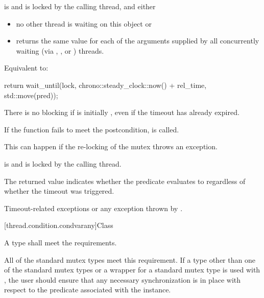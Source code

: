 \begin{itemdescr}
\pnum
\expects
{} is  and 
is locked by the calling thread, and either
\begin{itemize}
\item
no other thread is waiting on this  object or

\item
{} returns the same value for each of the  arguments
supplied by all concurrently waiting (via , , or
) threads.
\end{itemize}

\pnum
\effects
Equivalent to:
\begin{codeblock}
return wait_until(lock, chrono::steady_clock::now() + rel_time, std::move(pred));
\end{codeblock}

\pnum
\begin{note}
There is no blocking if  is initially , even if the
timeout has already expired.
\end{note}

\pnum
\remarks
If the function fails to meet the postcondition, 
is called.
\begin{note}
This can happen if the re-locking of the mutex throws an exception.
\end{note}

\pnum
\ensures
{} is  and 
is locked by the calling thread.

\pnum
\begin{note}
The returned value indicates whether the predicate evaluates to 
regardless of whether the timeout was triggered.
\end{note}

\pnum
\throws
Timeout-related
exceptions or any exception thrown by .
\end{itemdescr}

[thread.condition.condvarany]{Class }

\pnum
A  type shall meet the 
requirements.
\begin{note}
All of the standard
mutex types meet this requirement. If a  type other than one of the
standard mutex types or a  wrapper for a standard mutex type
is used with , the user should ensure that any
necessary synchronization is in place with respect to the predicate associated
with the  instance.
\end{note}

